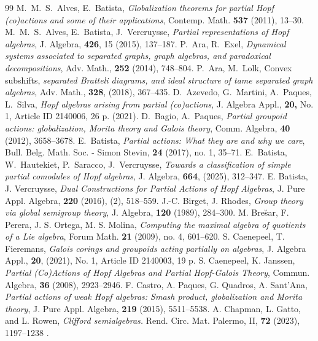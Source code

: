 \documentclass[10pt,a4paper]{amsart}
\theoremstyle{definition}
\theoremstyle{remark}
\numberwithin{equation}{section}
\newtheorem*{Theorem A}{\textbf{Theorem A}}
\newtheorem*{Corollary E}{\textbf{Corollary E}}
\newtheorem*{Corollary F}{\textbf{Corollary F}}
\newtheorem*{Theorem B}{\textbf{Theorem B}}
\newtheorem*{Theorem C}{\textbf{Theorem C}}
\newtheorem*{Theorem D}{\textbf{Theorem B}}
\newtheorem*{p a}{\textbf{Proof of  Theorem A}}
\newtheorem*{p b}{\textbf{Proof of Theorem B}}
\newtheorem*{p c}{\textbf{Proof of  Theorem C}}
\newtheorem*{p d}{\textbf{Proof of  Theorem D}}
\newcommand{\0}{{\vartheta}}
\begin{document}
\begin{thebibliography}{99}
 M.\ M.\ S.\ Alves, E.\ Batista, {\em Globalization theorems for partial Hopf (co)actions and some of their applications}, Contemp. Math. {\bf 537} (2011), 13--30.
 M.\ M.\ S.\ Alves, E.\ Batista, J.\ Vercruysse, {\em Partial representations of Hopf algebras}, J. Algebra, {\bf 426}, 15 (2015), 137--187.
 P.\ Ara, R.\ Exel, {\em Dynamical systems associated to separated graphs, graph algebras, and paradoxical decompositions}, Adv. Math., {\bf 252} (2014), 748--804.
 P.\ Ara, M.\ Lolk, Convex subshifts, {\em separated Bratteli diagrams, and ideal structure of tame separated graph algebras}, Adv. Math., {\bf 328}, (2018), 367--435.
 D.\ Azevedo, G.\ Martini, A.\ Paques, L.\ Silva, {\em Hopf algebras arising from partial (co)actions}, J. Algebra Appl., {\bf 20,} No. 1, Article ID 2140006, 26 p. (2021).
 D.\ Bagio, A.\ Paques, {\em Partial groupoid actions: globalization, Morita theory and Galois theory}, Comm. Algebra, {\bf 40} (2012), 3658--3678.
 E.\ Batista, {\em Partial actions: What they are and why we care}, Bull. Belg. Math. Soc. - Simon Stevin, {\bf 24} (2017), no. 1, 35--71.
 E.\ Batista, W.\ Hautekiet, P.\ Saracco, J.\ Vercruysse, {\em Towards a classification of simple partial comodules of Hopf algebras}, J. Algebra, {\bf 664}, (2025), 312--347.
 E. Batista, J. Vercruysse, {\em Dual Constructions for Partial Actions of Hopf Algebras}, J. Pure Appl. Algebra, {\bf 220} (2016), (2), 518--559.
 J.-C. Birget, J. Rhodes, {\em Group theory via global semigroup theory}, J. Algebra, {\bf 120} (1989), 284--300.
 M. Bre{\u s}ar, F. Perera, J. S. Ortega, M. S. Molina, {\em Computing the maximal algebra of quotients of a Lie algebra}, Forum Math. {\bf 21} (2009), no. 4, 601--620.
 S. Caenepeel, T. Fieremans, {\em Galois corings and groupoids acting partially on algebras}, J. Algebra Appl., {\bf 20}, (2021), No. 1, Article ID 2140003, 19 p.
 S. Caenepeel, K. Janssen, {\em Partial (Co)Actions of Hopf Algebras and Partial Hopf-Galois Theory}, Commun. Algebra, {\bf 36} (2008), 2923--2946.
 F. Castro, A. Paques, G. Quadros, A. Sant'Ana, {\em Partial actions of weak Hopf algebras: Smash product, globalization and Morita theory}, J. Pure Appl. Algebra, {\bf 219} (2015), 5511--5538.
 A. Chapman, L. Gatto, and L. Rowen, {\em Clifford semialgebras.} Rend. Circ. Mat. Palermo, II, {\bf 72} (2023), 1197--1238 .

\end{thebibliography}
\end{document}
